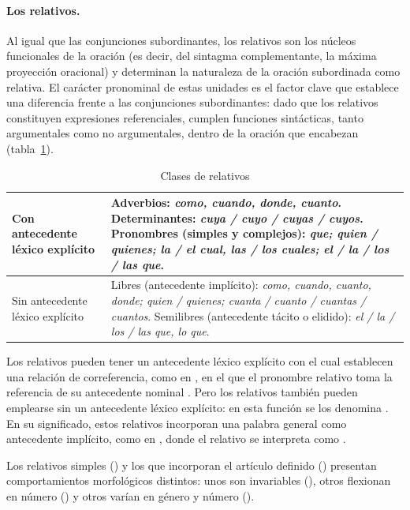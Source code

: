 \paragraph{Los relativos.}\label{sec:13-relativos}
Al igual que las conjunciones subordinantes, los relativos son los núcleos
funcionales de la oración (es decir, del sintagma complementante, la máxima
proyección oracional) y determinan la naturaleza de la oración subordinada como
relativa. El carácter pronominal de estas unidades es el factor clave que
establece una diferencia frente a las conjunciones subordinantes: dado que los
relativos constituyen expresiones referenciales, cumplen funciones sintácticas,
tanto argumentales como no argumentales, dentro de la oración que encabezan
(tabla~\ref{tab:13-relativos}).

{\small
\begin{longtable}{@{}>{\raggedright\arraybackslash}p{40mm}
    >{\raggedright\arraybackslash}p{83mm}@{}}
  \caption{Clases de relativos}\label{tab:13-relativos}\\
  \toprule
  \endfirsthead
  \toprule
  \endhead
  Con antecedente léxico explícito & Adverbios: \textit{como, cuando, donde,
    cuanto}. Determinantes: \textit{cuya / cuyo / cuyas / cuyos}. Pronombres
    (simples y complejos): \textit{que; quien / quienes; la / el cual, las / los
    cuales; el / la / los / las que}. \\
  \midrule
  Sin antecedente léxico explícito & Libres (antecedente implícito):
    \textit{como, cuando, cuanto, donde; quien / quienes; cuanta / cuanto /
    cuantas / cuantos}. Semilibres (antecedente tácito o elidido): \textit{el /
    la / los / las que, lo que}. \\
  \bottomrule
\end{longtable}}

Los relativos pueden tener un antecedente léxico explícito con el cual establecen
una relación de correferencia, como en , en el que
el pronombre relativo  toma la referencia de su antecedente nominal
. Pero los relativos también pueden emplearse sin un antecedente
léxico explícito: en esta función se los denomina . En
su significado, estos relativos incorporan una palabra general como antecedente
implícito, como en , donde el relativo
 se interpreta como .

Los relativos simples () y los que
incorporan el artículo definido () presentan comportamientos morfológicos distintos: unos son
invariables (), otros flexionan en número
() y otros varían en género y número
().

